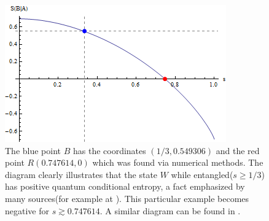 \begin{figure}[H]
\label{figure2}
\begin{center}
\includegraphics[scale=0.8]{figures/conditional_vonNeumann_Werner.png}
\caption{The blue point $B$ has the coordinates $(1/3,0.549306)$ and the red point $R(0.747614,0)$ which was found via numerical methods. The diagram clearly illustrates that the state $W$ while entangled($s\geq 1/3 $) has positive quantum conditional entropy, a fact emphasized by many sources(for example at \cite{nielsen2001separable}). This particular example becomes negative for $s  \gtrsim 0.747614$. A similar diagram can be found in \cite{patro2017non}.}
\end{center}
\end{figure}
